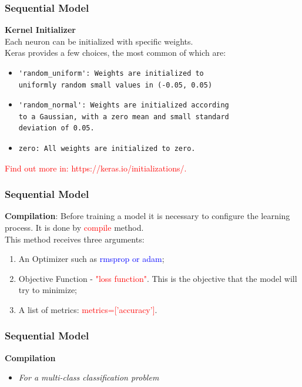 \documentclass[aspectratio=169]{beamer}
\begin{document}
\begin{frame}[fragile]
\frametitle{Sequential Model}
\textbf{Kernel Initializer} 
\\[0.6cm]
Each neuron can be initialized with specific weights.
\\[0.3cm]
Keras provides a few choices, the most common of which are:
\begin{itemize}
\item \begin{verbatim}'random_uniform': Weights are initialized to 
uniformly random small values in (-0.05, 0.05)\end{verbatim}  
\item \begin{verbatim}'random_normal': Weights are initialized according 
to a Gaussian, with a zero mean and small standard 
deviation of 0.05.\end{verbatim}
\item \begin{verbatim}zero: All weights are initialized to zero.\end{verbatim}
\end{itemize}
\textcolor{red}{Find out more in: https://keras.io/initializations/.} 
\end{frame}

\begin{frame}
\frametitle{Sequential Model}
\textbf{Compilation}:
Before training a model it is necessary to configure the learning process. It is done by \textcolor{red}{compile} method. 
\\[0.5cm]
This method receives three arguments:
\\[0.3cm]
\begin{enumerate}
\item An Optimizer such as \textcolor{blue}{rmsprop or adam};
\\[0.3cm]
\item  Objective Function - \textcolor{red}{"loss function"}. This is the objective that the model will try to minimize;
\\[0.3cm]
\item A list of metrics: \textcolor{red}{metrics=['accuracy']}.
\end{enumerate}
\end{frame}

\begin{frame}
\frametitle{Sequential Model}
\textbf{Compilation}
\\[0.5cm]
\begin{itemize}
\item \textit{For a multi-class classification problem}
\inputminted{python}{./aux_files/two.py}
\end{itemize}
\end{frame}
\end{document}
